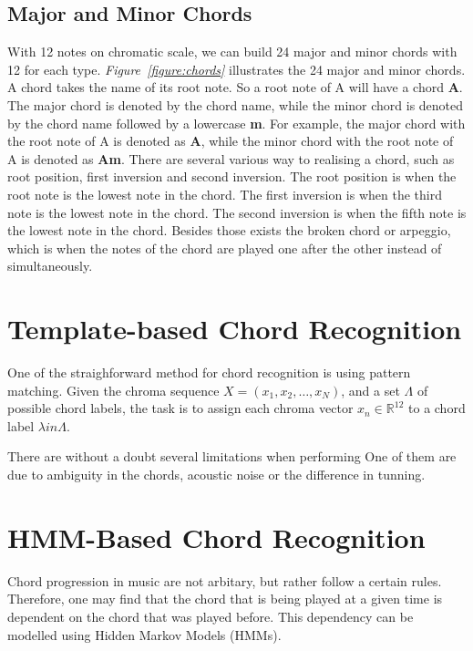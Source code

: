 \documentclass[a4paper, 9pt, twocolumn]{extarticle}
\begin{document}
\subsection{Major and Minor Chords}
\label{subsection:major_minor}
With 12 notes on chromatic scale, we can build 24 major and minor chords with 12 for each type. \emph{Figure~\ref{figure:chords}} illustrates the 24 major and minor chords. A chord takes the name of its root note. So a root note of A will have a chord \textbf{A}. The major chord is denoted by the chord name, while the minor chord is denoted by the chord name followed by a lowercase \textbf{m}. For example, the major chord with the root note of A is denoted as \textbf{A}, while the minor chord with the root note of A is denoted as \textbf{Am}.
There are several various way to realising a chord, such as root position, first inversion and second inversion. The root position is when the root note is the lowest note in the chord. The first inversion is when the third note is the lowest note in the chord. The second inversion is when the fifth note is the lowest note in the chord. Besides those exists the broken chord or arpeggio, which is when the notes of the chord are played one after the other instead of simultaneously. 




\section{Template-based Chord Recognition}
\label{section:template_recognition}
One of the straighforward method for chord recognition is using pattern matching. Given the chroma sequence $X = (x_1, x_2, \ldots, x_N)$, and a set $\Lambda$ of possible chord labels, the task is to assign each chroma vector $x_n \in \mathbb{R}^{12}$ to a chord label $\lambda in \Lambda$.

There are without a doubt several limitations when performing  One of them are due to ambiguity in the chords, acoustic noise or the difference in tunning.


\section{HMM-Based Chord Recognition}
\label{section:HMM_recognition}
Chord progression in music are not arbitary, but rather follow a certain rules. Therefore, one may find that the chord that is being played at a given time is dependent on the chord that was played before. This dependency can be modelled using Hidden Markov Models (HMMs).
\end{document}

